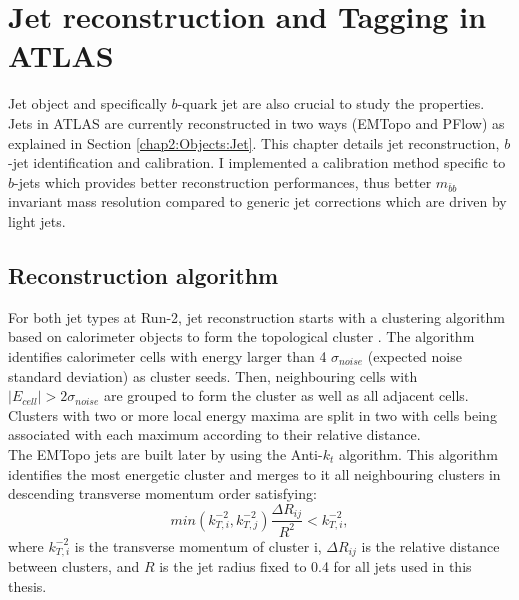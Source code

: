 \newpage
\chapter{Jet reconstruction and Tagging in ATLAS}
\label{Jet}
Jet object and specifically $b$-quark jet are also crucial to study the \HHyybb properties. Jets in ATLAS are currently reconstructed in two ways (EMTopo and PFlow) as explained in Section \ref{chap2:Objects:Jet}. This chapter details jet reconstruction, $b$-jet identification and calibration. I implemented a calibration method specific to $b$-jets which provides better reconstruction performances, thus better $m_{\bar{b}b}$ invariant mass resolution compared to generic jet corrections which are driven by light jets.

\section{Reconstruction algorithm}
\label{Jet:JR}
For both jet types at Run-2, jet reconstruction starts with a clustering algorithm based on calorimeter objects to form the topological cluster \cite{Jet_Algo_Perf}. The algorithm identifies calorimeter cells with energy larger than 4 $\sigma_{noise}$ (expected noise standard deviation) as cluster seeds. Then, neighbouring cells with $|E_{cell}| > 2\sigma_{noise}$ are grouped to form the cluster as well as all adjacent cells. Clusters with two or more local energy maxima are split in two with cells being associated with each maximum according to their relative distance. \\
The EMTopo jets are built later by using the Anti-$k_t$ algorithm. This algorithm identifies the most energetic cluster and merges to it all neighbouring clusters in descending transverse momentum order satisfying:
\begin{equation}
    min(k_{T,i}^{-2}, k_{T,j}^{-2}) \frac{\Delta R_{ij}}{R^2} < k_{T,i}^{-2},
\end{equation}
where $k_{T,i}^{-2}$ is the transverse momentum of cluster i, $\Delta R_{ij}$ is the relative distance between clusters, and $R$ is the jet radius fixed to 0.4 for all jets used in this thesis. \\
